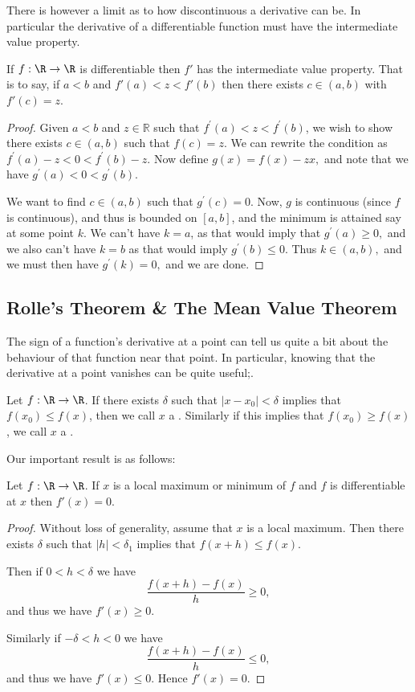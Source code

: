 \documentclass[a4paper]{scrartcl}
\begin{document}
There is however a limit as to how discontinuous a derivative can be. In particular the derivative of a differentiable function must have the intermediate value property.

\begin{theorem}
	If $f: \R \rightarrow \R$ is differentiable then $f'$ has the intermediate value property. That is to say, if $a < b$ and $f'(a) < z < f'(b)$ then there exists $c \in (a, b)$ with $f'(c) = z$.
\end{theorem}
\begin{proof}
Given $a<b$ and $z \in \mathbb{R}$ such that $f^{\prime}(a)<z<f^{\prime}(b)$, we wish to show there exists $c \in(a, b)$ such that $f(c)=z$. We can rewrite the condition as $f^{\prime}(a)-z<0<f^{\prime}(b)-z$. Now define $g(x)=f(x)-z x,$ and note that we have $g^{\prime}(a)<0<g^{\prime}(b)$.

We want to find $c \in(a, b)$ such that $g^{\prime}(c)=0$. Now, $g$ is continuous (since $f$ is continuous), and thus is bounded on $[a, b]$, and the minimum is attained say at some point $k$. We can't have $k=a$, as that would imply that $g^{\prime}(a) \geq 0,$ and we also can't have $k=b$ as that would imply $g^{\prime}(b) \leq 0$. Thus $k \in(a, b),$ and we must then have $g^{\prime}(k)=0,$ and we are done.
\end{proof}

\subsection{Rolle's Theorem \& The Mean Value Theorem}

The sign of a function's derivative at a point can tell us quite a bit about the behaviour of that function near that point.
In particular, knowing that the derivative at a point vanishes can be quite useful;.

\begin{definition}
	Let $f: \R \rightarrow \R$. If there exists $\delta$ such that $|x - x_0| < \delta$ implies that $f(x_0) \leq f(x)$, then we call $x$ a . 
	Similarly if this implies that $f(x_0) \geq f(x)$, we call $x$ a . 
\end{definition}

Our important result is as follows:

\begin{lemma}\label{lemma:maxima}
	Let $f: \R \rightarrow \R$. If $x$ is a local maximum or minimum of $f$ and $f$ is differentiable at $x$ then $f'(x) = 0$.
\end{lemma}
\begin{proof}
	Without loss of generality, assume that $x$ is a local maximum. Then there exists $\delta$ such that $|h| < \delta_1$ implies that $f(x + h) \leq f(x)$. 
	
	Then if $0 < h < \delta$ we have
	$$
		\frac{f(x + h) - f(x)}{h} \geq 0,
	$$
	and thus we have $f'(x) \geq 0$.

	Similarly if $- \delta < h < 0$ we have
	$$
	\frac{f(x + h) - f(x)}{h} \leq 0,
	$$
	and thus we have $f'(x) \leq 0$. Hence $f'(x) = 0$.
\end{proof}
\end{document}
